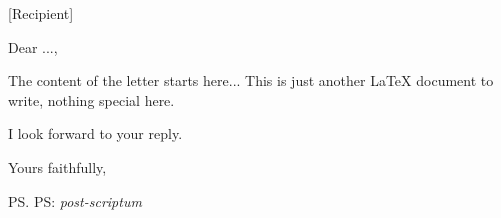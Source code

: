 \documentclass[a4paper
	,11pt
	]{letter}
\begin{document}
\pagestyle{plain}
\begin{letter}{%
	[Recipient]
}

\opening{Dear ...,}

The content of the letter starts here...
This is just another \LaTeX{} document to write, nothing special here.

I look forward to your reply.

\closing{Yours faithfully,}
\ps{PS: \emph{post-scriptum}}

\end{letter}
\end{document}
